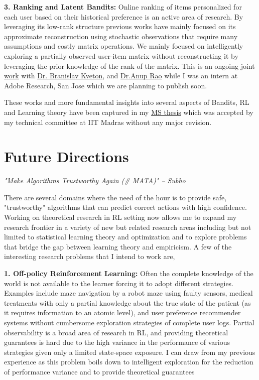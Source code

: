 \documentclass{article}
\begin{document}
\textbf{3. Ranking and Latent Bandits:} Online ranking of items personalized for each user based on their historical preference is an active area of research. By leveraging its low-rank structure previous works have mainly focused on its approximate reconstruction using stochastic observations that require many assumptions and costly matrix operations. We mainly focused on intelligently exploring a partially observed user-item matrix without reconstructing it by leveraging the prior knowledge of the rank of the matrix. This is an ongoing joint \href{https://subhojyoti.github.io/pdf/paper.pdf}{\underline{\color{blue} work}} with \href{http://www.bkveton.com/}{\underline{\color{red}Dr. Branislav Kveton}}, and \href{https://sites.google.com/site/anupraob/}{\underline{\color{red}Dr.Anup Rao}}  while I was an intern at Adobe Research, San Jose which we are planning to publish soon.

These works and more fundamental insights into several aspects of Bandits, RL and Learning theory have been captured in my \href{https://www.cse.iitm.ac.in/~ravi/papers/Subhojyoti_thesis.pdf}{\underline{\color{blue}MS thesis}} which was accepted by my technical committee at IIT Madras without any major revision.
     
     
    
\vspace*{-2em}
\section{Future Directions}
\vspace*{-1em}

\begin{center} \textit{"Make Algorithms Trustworthy Again (\# MATA)" -- Subho}\end{center}

There are several domains where the need of the hour is to provide safe, "trustworthy" algorithms that can predict correct actions with high confidence. Working on theoretical research in RL setting now allows me to expand my research frontier in a variety of new but related research areas including but not limited to statistical learning theory and optimization and to explore problems that bridge the gap between learning theory and empiricism. A few of the interesting research problems
that I intend to work are,

\textbf{1. Off-policy Reinforcement Learning:} Often the complete knowledge of the world is not available to the learner forcing it to adopt different strategies. Examples include maze navigation by a robot maze using faulty sensors, medical treatments with only a partial knowledge about the true state of the patient (as it requires information to
an atomic level), and user preference recommender systems without cumbersome exploration strategies of complete user logs. Partial observability is a broad area of research in RL, and providing theoretical guarantees is hard due to the high variance in the performance of various strategies given only a limited state-space exposure. I
can draw from my previous experience as this problem boils down to intelligent exploration for the reduction of performance variance and to provide theoretical guarantees
\end{document}
